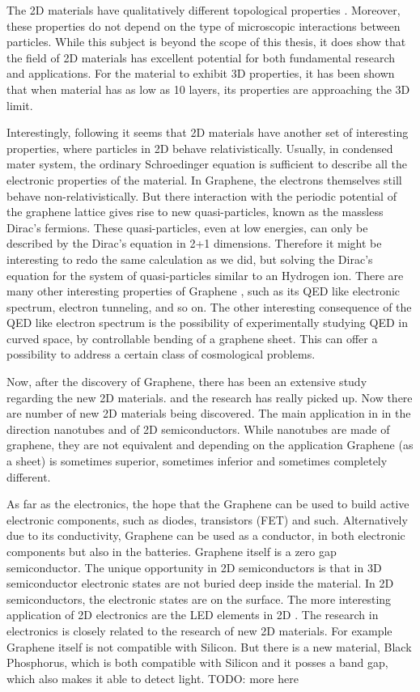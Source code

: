 The 2D materials have qualitatively different topological properties \cite{2DMatterCurvature}. Moreover, these properties do not depend on the type of microscopic interactions between particles. While this subject is beyond the scope of this thesis, it does show that the field of 2D materials has excellent potential for both fundamental research and applications. For the material to exhibit 3D properties, it has been shown \cite{GraphLayers} that when material has as low as 10 layers, its properties are approaching the 3D limit.

Interestingly, following \cite{Graphene0} it seems that 2D materials have another set of interesting properties, where particles in 2D behave relativistically. Usually, in condensed mater system, the ordinary Schroedinger equation is sufficient to describe all the electronic properties of the material. In Graphene, the electrons themselves still behave non-relativistically. But there interaction with the periodic potential of the graphene lattice gives rise to new quasi-particles, known as the massless Dirac's fermions. These quasi-particles, even at low energies, can only be described by the Dirac's equation in 2+1 dimensions. Therefore it might be interesting to redo the same calculation as we did, but solving the Dirac's equation for the system of quasi-particles similar to an Hydrogen ion.  There are many other interesting properties of Graphene \cite{Graphene0}, such as its QED like electronic spectrum, electron tunneling, and so on. The other interesting consequence of the QED like electron spectrum is the possibility of experimentally studying QED in curved space, by controllable bending of a graphene sheet. This can offer a possibility to address a certain class of cosmological problems. 

Now, after the discovery of Graphene, there has been an extensive study regarding the new 2D materials. and the research has really picked up. Now there are number of new 2D materials being discovered.  The main application in in the direction nanotubes and of 2D semiconductors. While nanotubes are made of graphene, they are not equivalent and depending on the application Graphene (as a sheet) is sometimes superior, sometimes inferior and sometimes completely different.

As far as the electronics, the hope that the Graphene can be used to build active electronic components, such as diodes, transistors (FET) and such. Alternatively due to its conductivity, Graphene can be used as a conductor, in both electronic components but also in the batteries. Graphene itself is a zero gap semiconductor. The unique opportunity in 2D semiconductors is that in 3D semiconductor electronic states are not buried deep inside the material. In 2D semiconductors, the electronic states are on the surface. The more interesting application of 2D electronics are the LED elements in 2D \cite{2DLED}. The research in electronics is closely related to the research of new 2D materials. For example Graphene itself is not compatible with Silicon. But there is a new material, Black Phosphorus, which is both compatible with Silicon and it posses a band gap, which also makes it able to detect light. TODO: more here

